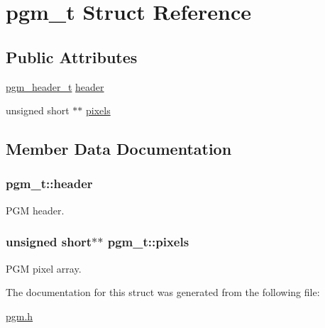 \hypertarget{structpgm__t}{}\section{pgm\+\_\+t Struct Reference}
\label{structpgm__t}
\subsection*{Public Attributes}
\begin{DoxyCompactItemize}
\item 
\hyperlink{structpgm__header__t}{pgm\+\_\+header\+\_\+t} \hyperlink{structpgm__t_ae4714e6f1485abb0c39a255d9b96d282}{header}
\item 
unsigned short $\ast$$\ast$ \hyperlink{structpgm__t_a452d2f4dd22b4b515812ce3f6676649d}{pixels}
\end{DoxyCompactItemize}


\subsection{Member Data Documentation}
\hypertarget{structpgm__t_ae4714e6f1485abb0c39a255d9b96d282}{}
\subsubsection[{header}]{ pgm\+\_\+t\+::header}\label{structpgm__t_ae4714e6f1485abb0c39a255d9b96d282}
P\+G\+M header. \hypertarget{structpgm__t_a452d2f4dd22b4b515812ce3f6676649d}{}
\subsubsection[{pixels}]{\setlength{\rightskip}{0pt plus 5cm}unsigned short$\ast$$\ast$ pgm\+\_\+t\+::pixels}\label{structpgm__t_a452d2f4dd22b4b515812ce3f6676649d}
P\+G\+M pixel array. 

The documentation for this struct was generated from the following file\+:\begin{DoxyCompactItemize}
\item 
\hyperlink{pgm_8h}{pgm.\+h}\end{DoxyCompactItemize}
